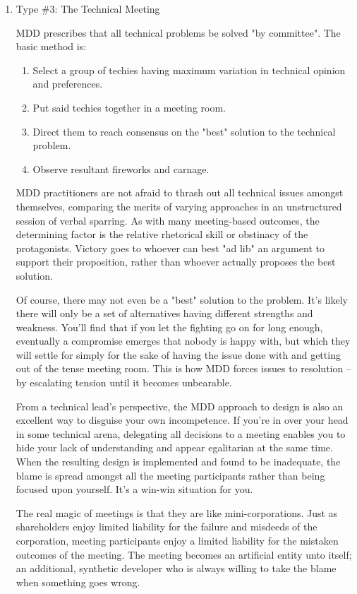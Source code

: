 \documentclass{article}
\begin{document}
\begin{enumerate}
\begin{enumerate}
\item Type \#3: The Technical Meeting
\label{sec:orgheadline183}

MDD prescribes that all technical problems be solved "by committee". The
basic method is:

\begin{enumerate}
\item Select a group of techies having maximum variation in technical
opinion and preferences.
\item Put said techies together in a meeting room.
\item Direct them to reach consensus on the "best" solution to the
technical problem.
\item Observe resultant fireworks and carnage.
\end{enumerate}

MDD practitioners are not afraid to thrash out all technical issues
amongst themselves, comparing the merits of varying approaches in an
unstructured session of verbal sparring. As with many meeting-based
outcomes, the determining factor is the relative rhetorical skill or
obstinacy of the protagonists. Victory goes to whoever can best "ad lib"
an argument to support their proposition, rather than whoever actually
proposes the best solution.

Of course, there may not even be a "best" solution to the problem. It's
likely there will only be a set of alternatives having different
strengths and weakness. You'll find that if you let the fighting go on
for long enough, eventually a compromise emerges that nobody is happy
with, but which they will settle for simply for the sake of having the
issue done with and getting out of the tense meeting room. This is how
MDD forces issues to resolution -- by escalating tension until it
becomes unbearable.

From a technical lead's perspective, the MDD approach to design is also
an excellent way to disguise your own incompetence. If you're in over
your head in some technical arena, delegating all decisions to a meeting
enables you to hide your lack of understanding and appear egalitarian at
the same time. When the resulting design is implemented and found to be
inadequate, the blame is spread amongst all the meeting participants
rather than being focused upon yourself. It's a win-win situation for
you.

The real magic of meetings is that they are like mini-corporations. Just
as shareholders enjoy limited liability for the failure and misdeeds of
the corporation, meeting participants enjoy a limited liability for the
mistaken outcomes of the meeting. The meeting becomes an artificial
entity unto itself; an additional, synthetic developer who is always
willing to take the blame when something goes wrong.


\end{enumerate}
\end{enumerate}
\end{document}
